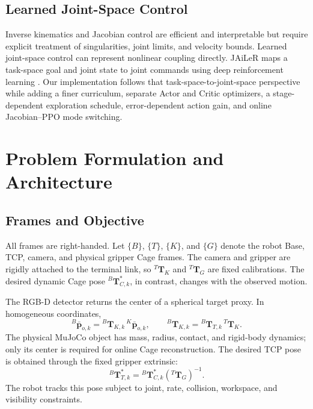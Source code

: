 \documentclass[conference]{IEEEtran}
\begin{document}
\subsection{Learned Joint-Space Control}

Inverse kinematics and Jacobian control are efficient and interpretable but require explicit treatment of singularities, joint limits, and velocity bounds. Learned joint-space control can represent nonlinear coupling directly. JAiLeR maps a task-space goal and joint state to joint commands using deep reinforcement learning \cite{kumar2021}. Our implementation follows that task-space-to-joint-space perspective while adding a finer curriculum, separate Actor and Critic optimizers, a stage-dependent exploration schedule, error-dependent action gain, and online Jacobian--PPO mode switching.

\section{Problem Formulation and Architecture}

\subsection{Frames and Objective}

All frames are right-handed. Let $\{B\}$, $\{T\}$, $\{K\}$, and $\{G\}$ denote the robot Base, TCP, camera, and physical gripper Cage frames. The camera and gripper are rigidly attached to the terminal link, so \({}^{T}\mathbf T_K\) and \({}^{T}\mathbf T_G\) are fixed calibrations. The desired dynamic Cage pose \({}^{B}\mathbf T^{*}_{C,k}\), in contrast, changes with the observed motion.

The RGB-D detector returns the center of a spherical target proxy. In homogeneous coordinates,
\begin{equation}
{}^{B}\bar{\mathbf p}_{o,k}
= {}^{B}\mathbf T_{K,k}\,{}^{K}\bar{\mathbf p}_{o,k},
\qquad
{}^{B}\mathbf T_{K,k}
= {}^{B}\mathbf T_{T,k}\,{}^{T}\mathbf T_K .
\label{eq:camera_to_base}
\end{equation}
The physical MuJoCo object has mass, radius, contact, and rigid-body dynamics; only its center is required for online Cage reconstruction. The desired TCP pose is obtained through the fixed gripper extrinsic:
\begin{equation}
{}^{B}\mathbf T^{*}_{T,k}
= {}^{B}\mathbf T^{*}_{C,k}
\left({}^{T}\mathbf T_G\right)^{-1}.
\label{eq:cage_to_tcp}
\end{equation}
The robot tracks this pose subject to joint, rate, collision, workspace, and visibility constraints.
\end{document}
